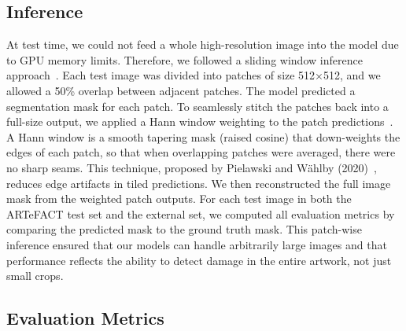 \documentclass[conference]{IEEEtran}
\begin{document}
\subsection*{Inference}
At test time, we could not feed a whole high-resolution image into the model due to GPU memory limits. Therefore, we followed a sliding window inference approach~\cite{ivanova_artefact_2024}. Each test image was divided into patches of size 512×512, and we allowed a 50\% overlap between adjacent patches. The model predicted a segmentation mask for each patch. To seamlessly stitch the patches back into a full-size output, we applied a Hann window weighting to the patch predictions~\cite{ivanova_artefact_2024}. A Hann window is a smooth tapering mask (raised cosine) that down-weights the edges of each patch, so that when overlapping patches were averaged, there were no sharp seams. This technique, proposed by Pielawski and Wählby (2020)~\cite{pielawski_introducing_2020}, reduces edge artifacts in tiled predictions. We then reconstructed the full image mask from the weighted patch outputs. For each test image in both the ARTeFACT test set and the external set, we computed all evaluation metrics by comparing the predicted mask to the ground truth mask. This patch-wise inference ensured that our models can handle arbitrarily large images and that performance reflects the ability to detect damage in the entire artwork, not just small crops.

\subsection*{Evaluation Metrics}
\end{document}
